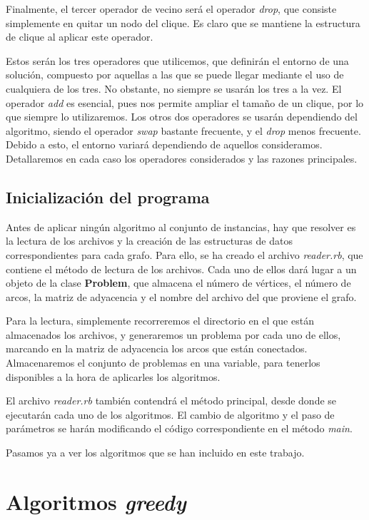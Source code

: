Finalmente, el tercer operador de vecino será el operador \textit{drop}, que consiste simplemente en quitar
un nodo del clique. Es claro que se mantiene la estructura de clique al aplicar este operador.

Estos serán los tres operadores que utilicemos, que definirán el entorno de una solución, compuesto por
aquellas a las que se puede llegar mediante el uso de cualquiera de los tres. No obstante, no siempre se
usarán los tres a la vez. El operador \textit{add} es esencial, pues nos permite ampliar el tamaño de un
clique, por lo que siempre lo utilizaremos. Los otros dos operadores se usarán dependiendo del algoritmo,
siendo el operador \textit{swap} bastante frecuente, y el \textit{drop} menos frecuente. Debido a esto,
el entorno variará dependiendo de aquellos consideramos. Detallaremos en cada caso los operadores
considerados y las razones principales.

\subsection{Inicialización del programa}
Antes de aplicar ningún algoritmo al conjunto de instancias, hay que resolver es la lectura de los
archivos y la creación de las estructuras de datos correspondientes para cada grafo. Para ello,
se ha creado el archivo \textit{reader.rb}, que contiene el método de lectura de los archivos.
Cada uno de ellos dará lugar a un objeto de la clase \textbf{Problem}, que almacena el número de
vértices, el número de arcos, la matriz de adyacencia y el nombre del archivo del que proviene el grafo.

Para la lectura, simplemente recorreremos el directorio en el que están almacenados los archivos,
y generaremos un problema por cada uno de ellos, marcando en la matriz de adyacencia los arcos
que están conectados. Almacenaremos el conjunto de problemas en una variable, para tenerlos
disponibles a la hora de aplicarles los algoritmos.

El archivo \textit{reader.rb} también contendrá el método principal, desde donde se ejecutarán
cada uno de los algoritmos. El cambio de algoritmo y el paso de parámetros se harán modificando
el código correspondiente en el método \textit{main}.

Pasamos ya a ver los algoritmos que se han incluido en este trabajo.

\section{Algoritmos \textit{greedy}}

